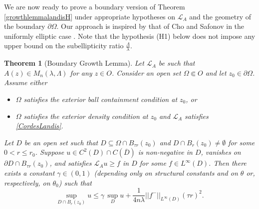 \documentclass[12pt]{amsart}
\newtheorem{Theorem}{Theorem}[section]
\newcommand{\Lop}{\mathcal{L}}
\def \L {\mathcal{L}}
\def \O {\Omega}
\def \t {\tau}
\begin{document}
We are now ready to prove a boundary version of Theorem \ref{growthlemmalandisH} under appropriate hypotheses on $\Lop_A$ and the geometry of the boundary $\partial \O$.  Our approach is inspired by that of Cho and Safonov in the uniformly elliptic case \cite{ChoSafonov}. Note that the hypothesis (H1) below does not impose any upper bound on the subellipticity ratio $\frac{\Lambda}{\lambda}$.

\begin{Theorem}[Boundary Growth Lemma]\label{bogrth}
Let $\L_A$ be such that $A(z)\in M_n(\lambda,\Lambda)$ for any $z\in O$.
Consider an open set $\O \Subset O$ and let $z_0\in\partial\O$. Assume either
\begin{itemize}
\item[(H1)] $\O$ satisfies the exterior ball containment condition at $z_0$, or
\item[(H2)]  $\O$ satisfies the exterior density condition at $z_0$ and $\Lop_A$ satisfies \eqref{CordesLandis}.
\end{itemize}
Let $D$ be an open set such that $D\subseteq \O\cap B_{\t r}(z_0)$ and $D\cap B_r(z_0)\neq\emptyset$ for some $0<r\leq r_0$. Suppose $u \in C^2(D) \cap C(\overline{D})$ is non-negative in $D$, vanishes on $\partial D \cap B_{\t r}(z_0)$, and satisfies $\L_A u \geq f$ in $D$ for some $f \in L^{\infty}(D)$.  Then there exists a constant $\gamma \in (0,1)$ (depending only on structural constants and on $\theta$ or, respectively, on $\theta_0$) such that
\begin{equation}\label{bogrthestimate}
    \sup_{D \cap B_r(z_0)} u \leq \gamma \, \sup_{D} u + \frac{1}{4n\lambda} ||f^-||_{L^{\infty}(D)} (\tau r)^2.
\end{equation}
\end{Theorem}
\end{document}
